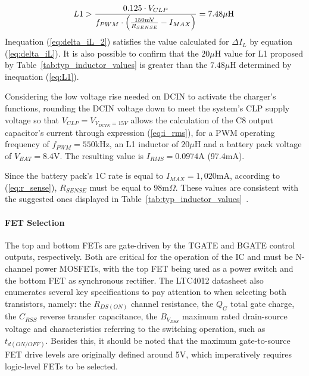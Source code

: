 \begin{equation}\label{eq:L1}
    L1 > \frac{0.125 \cdot V_{CLP}}{f_{PWM} \cdot \left(\frac{150 \textrm{mV}}{R_{SENSE}} - I_{MAX}\right)} = 7.48 \mu\textrm{H} \,\medskip
\end{equation}
Inequation (\ref{eq:delta_iL_2}) satisfies the value calculated for $\Delta I_L$ by equation (\ref{eq:delta_iL}). It is also possible to confirm that the $20\mu$H value for L1 proposed by Table~\ref{tab:typ_inductor_values} is greater than the $7.48 \mu$H determined by inequation (\ref{eq:L1}).

Considering the low voltage rise needed on DCIN to activate the charger's functions, rounding the DCIN voltage down to meet the system's CLP supply voltage so that $V_{CLP}=V_{V_{DCIN}=15V}$ allows the calculation of the C8 output capacitor's current through expression (\ref{eq:i_rms}), for a PWM operating frequency of $f_{PWM}=550$kHz, an L1 inductor of $20 \mu$H and a battery pack voltage of $V_{BAT}=8.4$V. The resulting value is $I_{RMS}=0.0974$A (97.4mA).

Since the battery pack's 1C rate is equal to $I_{MAX}=1,020$mA, according to (\ref{eq:r_sense}), $R_{SENSE}$ must be equal to 98m$\Omega$. These values are consistent with the suggested ones displayed in Table~\ref{tab:typ_inductor_values}~\cite{LTC4012}.

\paragraph{FET Selection}	The top and bottom FETs are gate-driven by the TGATE and BGATE control outputs, respectively. Both are critical for the operation of the IC and must be N-channel power MOSFETs, with the top FET being used as a power switch and the bottom FET as synchronous rectifier. The LTC4012 datasheet also enumerates several key specifications to pay attention to when selecting both transistors, namely: the $R_{DS(ON)}$ channel resistance, the $Q_G$ total gate charge, the $C_{RSS}$ reverse transfer capacitance, the $B_{V_{DSS}}$ maximum rated drain-source voltage and characteristics referring to the switching operation, such as $t_{d(ON/OFF)}$. Besides this, it should be noted that the maximum gate-to-source FET drive levels are originally defined around 5V, which imperatively requires logic-level FETs to be selected.

